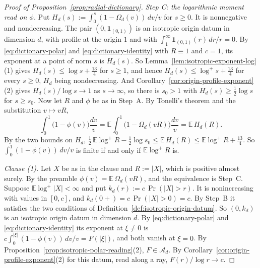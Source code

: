 \begin{proof}[Proof of Proposition~\ref{prop:radial-dictionary}]
\emph{Step C: the logarithmic moment read on $\phi$.} Put
$H_d(s) := \int_0^s (1 - \Omega_d(v))\,dv/v$ for $s \ge 0$. It is nonnegative and nondecreasing.
The pair $(0,\mathbf 1_{(0,1)})$ is an isotropic origin datum in dimension $d$, with profile at
the origin $1$ and with $\int_1^\infty\mathbf 1_{(0,1)}(r)\,dr/r = 0$. By
\ref{eq:dictionary-polar} and \ref{eq:dictionary-identity} with $R \equiv 1$ and $c = 1$, its
exponent at a point of norm $s$ is $H_d(s)$. So Lemma~\ref{lem:isotropic-exponent-log}(1) gives
$H_d(s) \le \log s + \tfrac{13}{4}$ for $s \ge 1$, and hence
$H_d(s) \le \log^+ s + \tfrac{13}{4}$ for every $s \ge 0$, $H_d$ being nondecreasing. And
Corollary~\ref{cor:origin-profile-exponent}(2) gives $H_d(s)/\log s \to 1$ as $s \to \infty$, so there is
$s_0 > 1$ with $H_d(s) \ge \tfrac12\log s$ for $s \ge s_0$. Now let $R$ and $\phi$ be as in
Step~A. By Tonelli's theorem and the substitution $v \mapsto vR$,
\[
  \int_0^1\bigl(1 - \phi(v)\bigr)\frac{dv}{v}
   = \mathbb{E}\int_0^1\bigl(1 - \Omega_d(vR)\bigr)\frac{dv}{v} = \mathbb{E}\,H_d(R) .
\]
By the two bounds on $H_d$,
$\tfrac12\,\mathbb{E}\log^+R - \tfrac12\log s_0 \le \mathbb{E}\,H_d(R) \le
\mathbb{E}\log^+R + \tfrac{13}{4}$. So $\int_0^1(1 - \phi(v))\,dv/v$ is finite if and only if
$\mathbb{E}\log^+R$ is.

\emph{Clause (1).} Let $X$ be as in the clause and $R := |X|$, which is positive almost surely.
By the preamble $\phi(v) = \mathbb{E}\,\Omega_d(vR)$, and the equivalence is Step~C. Suppose
$\mathbb{E}\log^+|X| < \infty$ and put $k_d(r) := c\,\Pr(|X| > r)$. It is nonincreasing with
values in $[0,c]$, and $k_d(0{+}) = c\,\Pr(|X| > 0) = c$. By Step~B it satisfies the two
conditions of Definition~\ref{def:isotropic-origin-datum}. So $(0,k_d)$ is an isotropic origin datum in
dimension $d$. By \ref{eq:dictionary-polar} and \ref{eq:dictionary-identity} its exponent at
$\xi \ne 0$ is $c\int_0^{|\xi|}(1 - \phi(v))\,dv/v = F(|\xi|)$, and both vanish at $\xi = 0$. By
Proposition~\ref{prop:isotropic-polar-reading}(2), $F \in \mathcal{A}_d$. By
Corollary~\ref{cor:origin-profile-exponent}(2) for this datum, read along a ray, $F(r)/\log r \to c$.


\end{proof}
